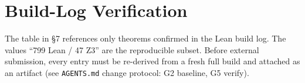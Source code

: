 \documentclass[11pt,a4paper]{article}
\begin{document}
\section{Build-Log Verification}
\label{app:buildlog}
The table in §7 references only theorems confirmed in the Lean build log. The values ``799 Lean / 47 Z3'' are the reproducible subset. Before external submission, every entry must be re-derived from a fresh full build and attached as an artifact (see \texttt{AGENTS.md} change protocol: G2 baseline, G5 verify).
\end{document}
